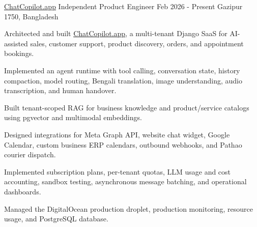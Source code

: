 \begin{cventries}
\cventry
    {\href{https://chatcopilot.app/}{ChatCopilot.app}} %
    {Independent Product Engineer} %
    {Feb 2026 - Present} %
    {Gazipur 1750, Bangladesh} %
    {
      \begin{cvitems}
        \item{Architected and built \href{https://chatcopilot.app/}{ChatCopilot.app}, a multi-tenant Django SaaS for AI-assisted sales, customer support, product discovery, orders, and appointment bookings.}
        \item{Implemented an agent runtime with tool calling, conversation state, history compaction, model routing, Bengali translation, image understanding, audio transcription, and human handover.}
        \item{Built tenant-scoped RAG for business knowledge and product/service catalogs using pgvector and multimodal embeddings.}
        \item{Designed integrations for Meta Graph API, website chat widget, Google Calendar, custom business ERP calendars, outbound webhooks, and Pathao courier dispatch.}
        \item{Implemented subscription plans, per-tenant quotas, LLM usage and cost accounting, sandbox testing, asynchronous message batching, and operational dashboards.}
        \item{Managed the DigitalOcean production droplet, production monitoring, resource usage, and PostgreSQL database.}
      \end{cvitems}
    }


\end{cventries}
